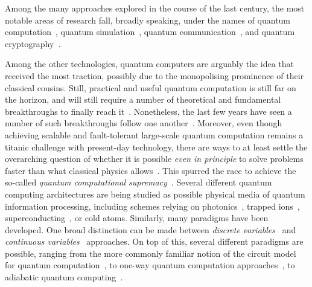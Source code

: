 Among the many approaches explored in the course of the last century, the most notable areas of research fall, broadly speaking, under the names of quantum computation~\cite{shor1997polynomial,steane1998quantum,ladd2010quantum}, quantum simulation~\cite{lloyd1996universal,georgescu2014quantum,koch2019quantum}, quantum communication~\cite{bennett1993teleporting}, and quantum cryptography~\cite{bennett2014quantum}.

Among the other technologies, quantum computers are arguably the idea that received the most traction, possibly due to the monopolising prominence of their classical cousins.
Still, practical and useful quantum computation is still far on the horizon, and will still require a number of theoretical and fundamental breakthroughs to finally reach it~\cite{preskill2018quantum,flamini2018photonic,wang2019integrated}.
Nonetheless, the last few years have seen a number of such breakthroughs follow one another~\cite{fowler2012surface,barends2014superconducting,córcoles2015demonstration,ofek2016extending,arute2019quantum}.
Moreover, even though achieving scalable and fault-tolerant large-scale quantum computation remains a titanic challenge with present-day technology, there are ways to at least settle the overarching question of whether it is possible \textit{even in principle} to solve problems faster than what classical physics allows~\cite{aaronson2011computational,bremner2016average,boixo2018characterizing,aaronson2017complexity,neill2018blueprint}. This spurred the race to achieve the so-called \textit{quantum computational supremacy}~\cite{gross2013the,broome2012photonic,spring2012boson,crespi2013integrated,tillmann2013experimental,bentivegna2015experimental,zhong201812photon,zhong2019experimental,wang2019boson,bouland2018complexity,arute2019quantum}.
Several different quantum computing architectures are being studied as possible physical media of quantum information processing, including schemes relying on photonics~\cite{wang2019integrated,flamini2018photonic}, trapped ions~\cite{bruzewicz2019trappedion,lekitsch2017blueprint}, superconducting~\cite{krantz2019quantum,you2011atomic}, or cold atoms.
Similarly, many paradigms have been developed. One broad distinction can be made between \textit{discrete variables}~\cite{walmsley2005applied,andersen2015hybrid} and \textit{continuous variables}~\cite{lloyd1999quantum,braunstein2005quantum} approaches.
On top of this, several different paradigms are possible, ranging from the more commonly familiar notion of the circuit model for quantum computation~\cite{nielsen2006quantum}, to one-way quantum computation approaches~\cite{raussendorf2001one,walther2005experimental,browne2006one}, to adiabatic quantum computing~\cite{aharonov2004adiabatic,albash2018adiabatic}.

